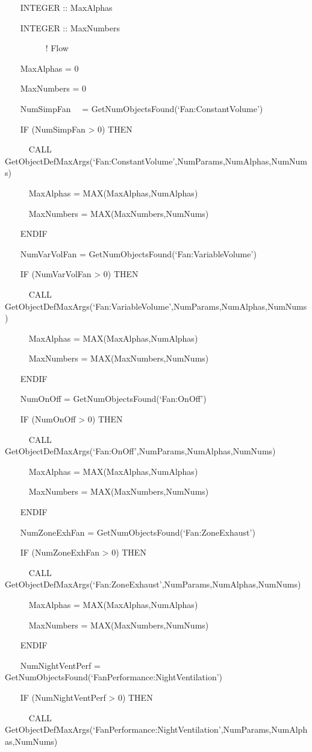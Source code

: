 ~~~ INTEGER :: MaxAlphas

~~~ INTEGER :: MaxNumbers

~~~~~~~~~ ! Flow

~~~ MaxAlphas = 0

~~~ MaxNumbers = 0

~~~ NumSimpFan~~ = GetNumObjectsFound(`Fan:ConstantVolume')

~~~ IF (NumSimpFan \textgreater{} 0) THEN

~~~~~ CALL GetObjectDefMaxArgs(`Fan:ConstantVolume',NumParams,NumAlphas,NumNums)

~~~~~ MaxAlphas = MAX(MaxAlphas,NumAlphas)

~~~~~ MaxNumbers = MAX(MaxNumbers,NumNums)

~~~ ENDIF

~~~ NumVarVolFan = GetNumObjectsFound(`Fan:VariableVolume')

~~~ IF (NumVarVolFan \textgreater{} 0) THEN

~~~~~ CALL GetObjectDefMaxArgs(`Fan:VariableVolume',NumParams,NumAlphas,NumNums)

~~~~~ MaxAlphas = MAX(MaxAlphas,NumAlphas)

~~~~~ MaxNumbers = MAX(MaxNumbers,NumNums)

~~~ ENDIF

~~~ NumOnOff = GetNumObjectsFound(`Fan:OnOff')

~~~ IF (NumOnOff \textgreater{} 0) THEN

~~~~~ CALL GetObjectDefMaxArgs(`Fan:OnOff',NumParams,NumAlphas,NumNums)

~~~~~ MaxAlphas = MAX(MaxAlphas,NumAlphas)

~~~~~ MaxNumbers = MAX(MaxNumbers,NumNums)

~~~ ENDIF

~~~ NumZoneExhFan = GetNumObjectsFound(`Fan:ZoneExhaust')

~~~ IF (NumZoneExhFan \textgreater{} 0) THEN

~~~~~ CALL GetObjectDefMaxArgs(`Fan:ZoneExhaust',NumParams,NumAlphas,NumNums)

~~~~~ MaxAlphas = MAX(MaxAlphas,NumAlphas)

~~~~~ MaxNumbers = MAX(MaxNumbers,NumNums)

~~~ ENDIF

~~~ NumNightVentPerf = GetNumObjectsFound(`FanPerformance:NightVentilation')

~~~ IF (NumNightVentPerf \textgreater{} 0) THEN

~~~~~ CALL GetObjectDefMaxArgs(`FanPerformance:NightVentilation',NumParams,NumAlphas,NumNums)

